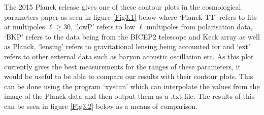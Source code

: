 \documentclass[a4paper,12pt,twoside]{report}
\begin{document}
The 2015 Planck release gives one of these contour plots in the cosmological parameters paper \cite{Planck} as seen in figure \ref{Fig3.1} below where `Planck TT' refers to fits at multipoles $\ell \ge 30$, `lowP' refers to low $\ell$ multipoles from polarisation data, `BKP' refers to the data being from the BICEP2 telescope \cite{Ade:2014xna} and Keck array \cite{Ade:2015fwj} as well as Planck, `lensing' refers to gravitational lensing being accounted for and `ext' refers to other external data such as baryon acoustic oscillation etc. As this plot currently gives the best measurements for the ranges of these parameters, it would be useful to be able to compare our results with their contour plots. This can be done using the program `xyscan' \cite{xyscan} which can interpolate the values from the image of the Planck data and then output them as a .txt file. The results of this can be seen in figure \ref{Fig3.2} below as a means of comparison.

\noindent%
\begin{minipage}{\linewidth}%
\label{Fig3.1}
\end{minipage}
\end{document}
